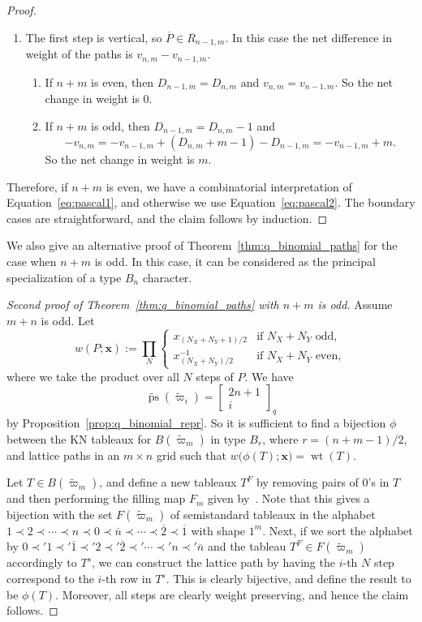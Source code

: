 \documentclass[11pt, leqno]{amsart}
\theoremstyle{plain}
\theoremstyle{definition}
\numberwithin{equation}{section}
\newcommand{\xx}{\mathbf{x}}
\newcommand{\fw}{\varpi} %
\newcommand{\tfw}{\widetilde{\fw}} %
\newcommand{\seteq}{\mathbin{:=}}
\newcommand{\qbinom}[3]{\left[ \begin{matrix} #1 \\ #2 \end{matrix} \right]_{#3}} %
\newcommand{\wt}{\operatorname{wt}} %
\newcommand{\ps}{\operatorname{ps}} %
\newcommand{\nps}{\widetilde{\ps}} %
\newcommand{\otwo}{\overline{2}}
\newcommand{\one}{\overline{1}}
\newcommand{\on}{\overline{n}}
\begin{document}
\begin{proof}
\begin{enumerate}
\item The first step is vertical, so $\overline{P} \in R_{n-1,m}$. In this case the net difference in weight of the paths is $v_{n,m} - v_{n-1,m}$.
\begin{enumerate}
\item If $n + m$ is even, then $D_{n-1,m} = D_{n,m}$ and $v_{n,m} = v_{n-1,m}$. So the net change in weight is $0$.
\item If $n + m$ is odd, then $D_{n-1,m} = D_{n,m} - 1$ and
\[
-v_{n,m} = -v_{n-1,m} + (D_{n,m} + m - 1) - D_{n-1,m} = -v_{n-1,m} + m.
\]
So the net change in weight is $m$.
\end{enumerate}
\end{enumerate}
Therefore, if $n + m$ is even, we have a combinatorial interpretation of Equation~\eqref{eq:pascal1}, and otherwise we use Equation~\eqref{eq:pascal2}. The boundary cases are straightforward, and the claim follows by induction.
\end{proof}

We also give an alternative proof of Theorem~\ref{thm:q_binomial_paths} for the case when $n + m$ is odd. In this case, it can be considered as the principal specialization of a type $B_n$ character.

\begin{proof}[Second proof of Theorem~\ref{thm:q_binomial_paths} with $n + m$ is odd]
Assume $m + n$ is odd.
Let
\[
w(P; \xx) \seteq \prod_N \begin{cases}
x_{(N_X + N_Y + 1) / 2} & \text{if $N_X + N_Y$ odd}, \\
x^{-1}_{(N_X + N_Y) / 2} & \text{if $N_X + N_Y$ even},
\end{cases}
\]
where we take the product over all $N$ steps of $P$.
We have
\[
\nps(\tfw_i) = \qbinom{2n+1}{i}{q}
\]
by Proposition~\ref{prop:q_binomial_repr}.
So it is sufficient to find a bijection $\phi$ between the KN tableaux for $B(\tfw_m)$ in type $B_r$, where $r = (n+m-1) / 2$, and lattice paths in an $m \times n$ grid such that $w\bigl( \phi(T); \xx \bigr) = \wt(T)$.

Let $T \in B(\tfw_m)$, and define a new tableaux $T^F$ by removing pairs of $0$'s in $T$ and then performing the filling map $F_m$ given by~\cite[\S3.4]{S05}. Note that this gives a bijection with the set $F(\tfw_m)$ of semistandard tableaux in the alphabet $1 \prec 2 \prec \cdots \prec n \prec 0 \prec \on \prec \cdots \prec \otwo \prec \one$ with shape $1^m$.
Next, if we sort the alphabet by $0 \prec' 1 \prec' \one \prec' 2 \prec' \otwo \prec' \cdots \prec' n \prec' \on$ and the tableau $T^F \in F(\tfw_m)$ accordingly to $T^s$, we can construct the lattice path by having the $i$-th $N$ step correspond to the $i$-th row in $T^s$. This is clearly bijective, and define the result to be $\phi(T)$. Moreover, all steps are clearly weight preserving, and hence the claim follows.
\end{proof}
\end{document}
